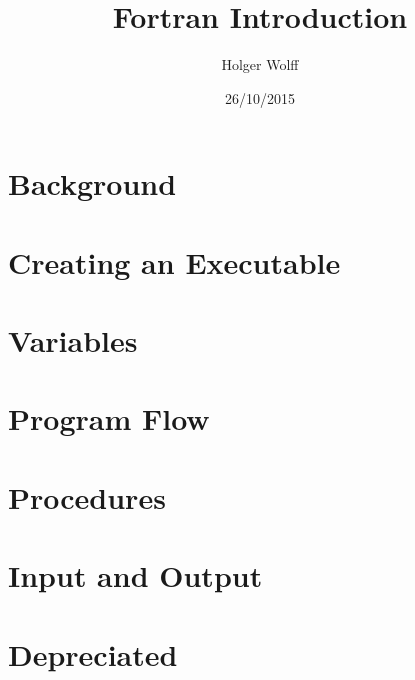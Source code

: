\documentclass{beamer}
\title{Fortran Introduction}
\author{Holger Wolff}
\date{26/10/2015}
\begin{document}
\begin{frame}
  \titlepage
\end{frame}

\section*{}

\begin{frame}
  \tableofcontents
\end{frame}

\section{Background}



\section{Creating an Executable}



\section{Variables}



\section{Program Flow}



\section{Procedures}



\section{Input and Output}



\section{Depreciated}



\section*{}


\end{document}
